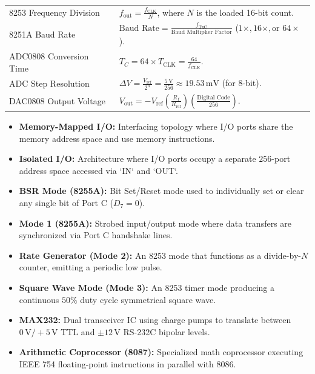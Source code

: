 \documentclass[12pt,a4paper]{article}
\renewcommand{\arraystretch}{1.45}
\begin{document}
\begin{tcolorbox}[formulabox, title={Key Formulas at a Glance}]
\renewcommand{\arraystretch}{1.2}
\noindent\begin{tabularx}{\linewidth}{B{4.5cm}Y}
8253 Frequency Division & $f_{\mathrm{out}} = \frac{f_{\mathrm{CLK}}}{N}$, where $N$ is the loaded 16-bit count. \\
8251A Baud Rate & $\text{Baud Rate} = \frac{f_{\mathrm{TxC}}}{\text{Baud Multiplier Factor}}$ ($1\times, 16\times, \text{or } 64\times$). \\
ADC0808 Conversion Time & $T_C = 64 \times T_{\mathrm{CLK}} = \frac{64}{f_{\mathrm{CLK}}}$. \\
ADC Step Resolution & $\Delta V = \frac{V_{\mathrm{ref}}}{2^n} = \frac{5\,\mathrm{V}}{256} \approx 19.53\,\mathrm{mV}$ (for 8-bit). \\
DAC0808 Output Voltage & $V_{\mathrm{out}} = -V_{\mathrm{ref}} \left(\frac{R_f}{R_{\mathrm{ref}}}\right) \left(\frac{\text{Digital Code}}{256}\right)$. \\
\end{tabularx}\par
\end{tcolorbox}

\begin{tcolorbox}[defbox, title={One-Line Definitions}]
\begin{itemize}[leftmargin=*, itemsep=2pt]
  \item \textbf{Memory-Mapped I/O:} Interfacing topology where I/O ports share the memory address space and use memory instructions.
  \item \textbf{Isolated I/O:} Architecture where I/O ports occupy a separate $256$-port address space accessed via `IN` and `OUT`.
  \item \textbf{BSR Mode (8255A):} Bit Set/Reset mode used to individually set or clear any single bit of Port C ($D_7 = 0$).
  \item \textbf{Mode 1 (8255A):} Strobed input/output mode where data transfers are synchronized via Port C handshake lines.
  \item \textbf{Rate Generator (Mode 2):} An 8253 mode that functions as a divide-by-$N$ counter, emitting a periodic low pulse.
  \item \textbf{Square Wave Mode (Mode 3):} An 8253 timer mode producing a continuous $50\%$ duty cycle symmetrical square wave.
  \item \textbf{MAX232:} Dual transceiver IC using charge pumps to translate between $0\,\mathrm{V}/+5\,\mathrm{V}$ TTL and $\pm 12\,\mathrm{V}$ RS-232C bipolar levels.
  \item \textbf{Arithmetic Coprocessor (8087):} Specialized math coprocessor executing IEEE 754 floating-point instructions in parallel with 8086.
\end{itemize}
\end{tcolorbox}
\end{document}
